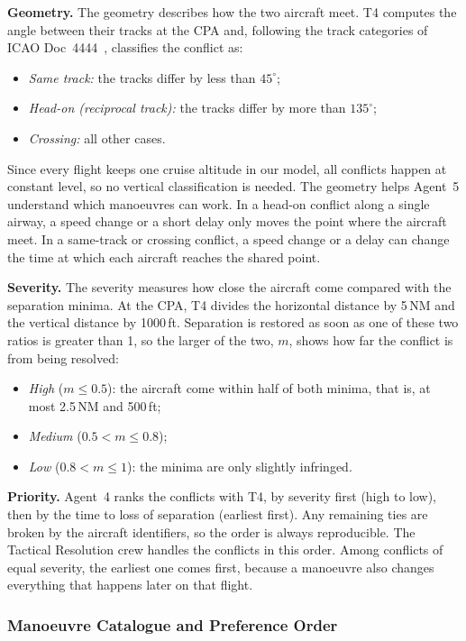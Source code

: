 \textbf{Geometry.} The geometry describes how the two aircraft meet. T4 computes the angle between their tracks at the CPA and, following the track categories of ICAO Doc~4444~\cite{icao4444}, classifies the conflict as:
\begin{itemize}
    \item \emph{Same track:} the tracks differ by less than $45^\circ$;
    \item \emph{Head-on (reciprocal track):} the tracks differ by more than $135^\circ$;
    \item \emph{Crossing:} all other cases.
\end{itemize}
Since every flight keeps one cruise altitude in our model, all conflicts happen at constant level, so no vertical classification is needed. The geometry helps Agent~5 understand which manoeuvres can work. In a head-on conflict along a single airway, a speed change or a short delay only moves the point where the aircraft meet. In a same-track or crossing conflict, a speed change or a delay can change the time at which each aircraft reaches the shared point.

\textbf{Severity.} The severity measures how close the aircraft come compared with the separation minima. At the CPA, T4 divides the horizontal distance by 5\,NM and the vertical distance by 1000\,ft. Separation is restored as soon as one of these two ratios is greater than 1, so the larger of the two, $m$, shows how far the conflict is from being resolved:
\begin{itemize}
    \item \emph{High} ($m \le 0.5$): the aircraft come within half of both minima, that is, at most 2.5\,NM and 500\,ft;
    \item \emph{Medium} ($0.5 < m \le 0.8$);
    \item \emph{Low} ($0.8 < m \le 1$): the minima are only slightly infringed.
\end{itemize}

\textbf{Priority.} Agent~4 ranks the conflicts with T4, by severity first (high to low), then by the time to loss of separation (earliest first). Any remaining ties are broken by the aircraft identifiers, so the order is always reproducible. The Tactical Resolution crew handles the conflicts in this order. Among conflicts of equal severity, the earliest one comes first, because a manoeuvre also changes everything that happens later on that flight.

\subsubsection{Manoeuvre Catalogue and Preference Order}\label{sec:manoeuvre-catalogue}

